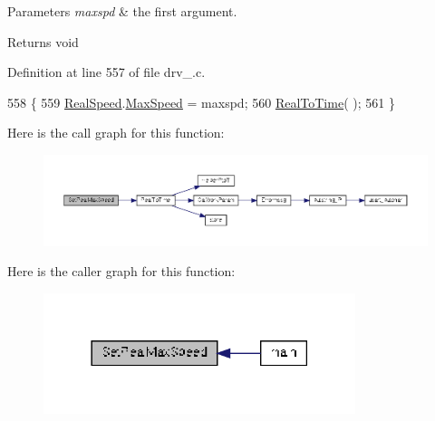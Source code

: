 \begin{DoxyParams}{Parameters}
{\em maxspd} & the first argument. \\
\hline
\end{DoxyParams}
\begin{DoxyReturn}{Returns}
void 
\end{DoxyReturn}


Definition at line 557 of file drv\-\_.\-c.


\begin{DoxyCode}
558 \{
559     \hyperlink{drv__8825_8c_a2e720ed1ed0ef90dba27c1f246048dcd}{RealSpeed}.\hyperlink{structMotor__Parameters_a501458e333945f49f03c295e2f49e3b9}{MaxSpeed} = maxspd;
560     \hyperlink{group__biba__drv_gad23127bea36c997c0b1c767f2421db6a}{RealToTime}( );
561 \}
\end{DoxyCode}


Here is the call graph for this function\-:
\nopagebreak
\begin{figure}[H]
\begin{center}
\leavevmode
\includegraphics[width=350pt]{group__biba__drv_ga544f7d7cdcd1fc93afaaa833d1086654_cgraph}
\end{center}
\end{figure}




Here is the caller graph for this function\-:
\nopagebreak
\begin{figure}[H]
\begin{center}
\leavevmode
\includegraphics[width=258pt]{group__biba__drv_ga544f7d7cdcd1fc93afaaa833d1086654_icgraph}
\end{center}
\end{figure}


